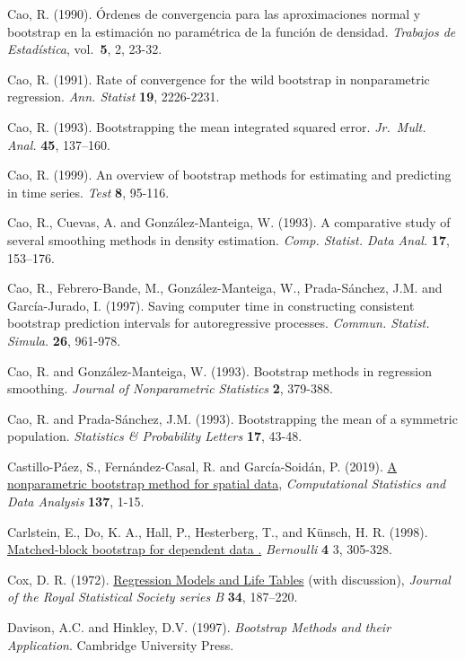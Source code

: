 \documentclass[
]{book}
\theoremstyle{definition}
\theoremstyle{definition}
\theoremstyle{definition}
\theoremstyle{remark}
\begin{document}
Cao, R. (1990). Órdenes de convergencia para las aproximaciones normal y
bootstrap en la estimación no paramétrica de la función de densidad.
\emph{Trabajos de Estadística}, vol.~\textbf{5}, 2, 23-32.

Cao, R. (1991). Rate of convergence for the wild bootstrap in
nonparametric regression. \emph{Ann. Statist} \textbf{19}, 2226-2231.

Cao, R. (1993). Bootstrapping the mean integrated squared error.
\emph{Jr.~Mult. Anal.} \textbf{45}, 137--160.

Cao, R. (1999). An overview of bootstrap methods for estimating and
predicting in time series. \emph{Test} \textbf{8}, 95-116.

Cao, R., Cuevas, A. and González-Manteiga, W. (1993). A comparative
study of several smoothing methods in density estimation.
\emph{Comp. Statist. Data Anal.} \textbf{17}, 153--176.

Cao, R., Febrero-Bande, M., González-Manteiga, W., Prada-Sánchez, J.M.
and García-Jurado, I. (1997). Saving computer time in constructing
consistent bootstrap prediction intervals for autoregressive processes.
\emph{Commun. Statist. Simula.} \textbf{26}, 961-978.

Cao, R. and González-Manteiga, W. (1993). Bootstrap methods in
regression smoothing. \emph{Journal of Nonparametric Statistics} \textbf{2},
379-388.

Cao, R. and Prada-Sánchez, J.M. (1993). Bootstrapping the mean of a
symmetric population. \emph{Statistics \& Probability Letters} \textbf{17}, 43-48.

Castillo-Páez, S., Fernández-Casal, R. and García-Soidán, P. (2019).
\href{https://www.sciencedirect.com/science/article/pii/S0167947319300325?via\%3Dihub}{A nonparametric bootstrap method for spatial data},
\emph{Computational Statistics and Data Analysis} \textbf{137}, 1-15.

Carlstein, E., Do, K. A., Hall, P., Hesterberg, T., and Künsch, H. R. (1998). \href{https://projecteuclid.org/euclid.bj/1174324983}{Matched-block bootstrap for dependent data .}
\emph{Bernoulli} \textbf{4} 3, 305-328.

Cox, D. R. (1972). \href{https://rss.onlinelibrary.wiley.com/doi/abs/10.1111/j.2517-6161.1972.tb00899.x}{Regression Models and Life Tables}
(with discussion), \emph{Journal of the Royal Statistical Society series B} \textbf{34}, 187--220.

Davison, A.C. and Hinkley, D.V. (1997).
\emph{Bootstrap Methods and their Application}. Cambridge University Press.
\end{document}
